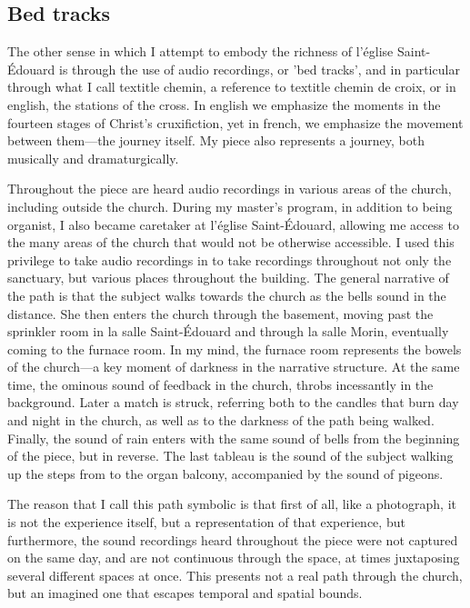 \documentclass[12pt,twoside,maitrise]{dms_ks}
\theoremstyle{definition}
\begin{document}
\subsection{Bed tracks}

The other sense in which I attempt to embody the richness of l'église Saint-Édouard is through the use of audio recordings, or 'bed tracks', and in particular through what I call textit{le chemin}, a reference to textit{le chemin de croix}, or in english, the stations of the cross. 
In english we emphasize the moments in the fourteen stages of Christ's cruxifiction, yet in french, we emphasize the movement between them---the journey itself. 
My piece also represents a journey, both musically and dramaturgically. 

Throughout the piece are heard audio recordings in various areas of the church, including outside the church. 
During my master's program, in addition to being organist, I also became caretaker at l'église Saint-Édouard, allowing me access to the many areas of the church that would not be otherwise accessible. 
I used this privilege to take audio recordings in to take recordings throughout not only the sanctuary, but various places throughout the building. 
The general narrative of the path is that the subject walks towards the church as the bells sound in the distance. 
She then enters the church through the basement, moving past the sprinkler room in la salle Saint-Édouard and through la salle Morin, eventually coming to the furnace room. 
In my mind, the furnace room represents the bowels of the church---a key moment of darkness in the narrative structure. 
At the same time, the ominous sound of feedback in the church, throbs incessantly in the background. 
Later a match is struck, referring both to the candles that burn day and night in the church, as well as to the darkness of the path being walked. 
Finally, the sound of rain enters with the same sound of bells from the beginning of the piece, but in reverse. 
The last tableau is the sound of the subject walking up the steps from to the organ balcony, accompanied by the sound of pigeons.

The reason that I call this path symbolic is that first of all, like a photograph, it is not the experience itself, but a representation of that experience, but furthermore, the sound recordings heard throughout the piece were not captured on the same day, and are not continuous through the space, at times juxtaposing several different spaces at once. 
This presents not a real path through the church, but an imagined one that escapes temporal and spatial bounds.
\end{document}
